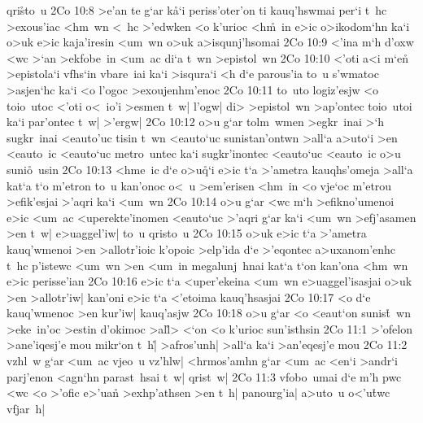 qri\r{s}to~u\bibvsend
{}
\vs 2Co 10:8
>e'an
te
g`ar
k\r{a}`i
periss'oter'on
ti
kauq'hswmai
per`i
t~hc
>exous'iac
<hm~wn
<~hc
>'edwken
<o
k'urioc
<h\r{m}~in
e>ic
o>ikodom`hn
ka`i
o>uk
e>ic
kaja'iresin
<um~wn
o>uk
a>isqunj'hsomai\bibvsend
\vs 2Co 10:9
<'ina
m`h
d'oxw
<wc
>`an
>ekfobe~in
<um~ac
di`a
t~wn
>epistol~wn\bibvsend
\vs 2Co 10:10
<'oti
a<i
m`en\r{}
>epistola`i
vfhs`in
vbare~iai
ka`i
>isqura`i
<h
d`e
parous'ia
to~u
s'wmatoc
>asjen`hc
ka`i
<o
l'ogoc
>exoujenhm'enoc\bibvsend
\vs 2Co 10:11
to~uto
logiz'esjw
<o
toio~utoc
<'oti
o<~io'i
>esmen
t~w|
l'ogw|
di>
>epistol~wn
>ap'ontec
toio~utoi
ka`i
par'ontec
t~w|
>'ergw|\bibvsend
\vs 2Co 10:12
o>u
g`ar
tolm~wmen
>egkr~inai
>`h
sugkr~inai
<eauto'uc
tisin
t~wn
<eauto`uc
sunistan'ontwn
>all`a
a>uto`i
>en
<eauto~ic
<eauto`uc
metro~untec
ka`i
sugkr'inontec
<eauto`uc
<eauto~ic
o>u
suni\r{o}~usin\bibvsend
{}
\vs 2Co 10:13
<hme~ic
d`e
o>u\r{q}`i
e>ic
t`a
>'ametra
kauqhs'omeja
>all`a
kat`a
t`o
m'etron
to~u
kan'onoc
o<~u
>em'erisen
<hm~in
<o
vje`oc
m'etrou
>efik'esjai
>'aqri
ka`i
<um~wn\bibvsend
\vs 2Co 10:14
o>u
g`ar
<wc
m`h
>efikno'umenoi
e>ic
<um~ac
<uperekte'inomen
<eauto`uc
>'aqri
g`ar
ka`i
<um~wn
>efj'asamen
>en
t~w|
e>uaggel'iw|
to~u
qristo~u\bibvsend
\vs 2Co 10:15
o>uk
e>ic
t`a
>'ametra
kauq'wmenoi
>en
>allotr'ioic
k'opoic
>elp'ida
d`e
>'eqontec
a>uxanom'enhc
t~hc
p'istewc
<um~wn
>en
<um~in
megalunj~hnai
kat`a
t`on
kan'ona
<hm~wn
e>ic
perisse'ian\bibvsend
\vs 2Co 10:16
e>ic
t`a
<uper'ekeina
<um~wn
e>uaggel'isasjai
o>uk
>en
>allotr'iw|
kan'oni
e>ic
t`a
<'etoima
kauq'hsasjai\bibvsend
\vs 2Co 10:17
<o
d`e
kauq'wmenoc
>en
kur'iw|
kauq'asjw\bibvsend
\vs 2Co 10:18
o>u
g`ar
<o
<eaut`on
sunis\r{t}~wn
>eke~in'oc
>estin
d'okimoc
>al\r{l}>
<`on
<o
k'urioc
sun'isthsin\bibvsend
\vs 2Co 11:1
>'ofelon
>ane'iqesj'e
mou
mikr`on
t~h|\r{}
>afros'unh|
>all`a
ka`i
>an'eqesj'e
mou\bibvsend
\vs 2Co 11:2
vzhl~w
g`ar
<um~ac
vjeo~u
vz'hlw|
<hrmos'amhn
g`ar
<um~ac
<en`i
>andr`i
parj'enon
<agn`hn
parast~hsai
t~w|
qrist~w|\bibvsend
\vs 2Co 11:3
vfobo~umai
d`e
m'h
pwc
<wc
<o
>'ofic
e>'uan\r{}
>exhp'athsen
>en
t~h|
panourg'ia|
a>uto~u
o<'u\r{t}wc
vfjar~h|

